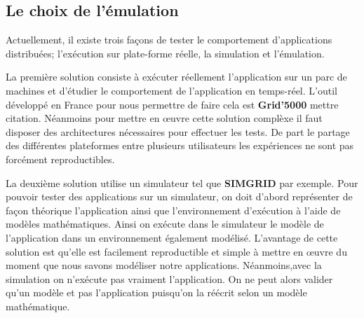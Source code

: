 \subsection{Le choix de l'émulation}

Actuellement, il existe trois façons de tester le comportement d'applications distribuées; l'exécution sur plate-forme réelle, la simulation et l'émulation. 

La première solution consiste à exécuter réellement l'application sur un parc de machines et d'étudier le comportement de l'application en temps-réel. L'outil développé en France pour nous permettre de faire cela est \textbf{Grid'5000} {\color{red}mettre citation}. Néanmoins pour mettre en \oe uvre cette solution complèxe il faut disposer des architectures nécessaires pour effectuer les tests. De part le partage des différentes plateformes entre plusieurs utilisateurs les expériences ne sont pas forcément reproductibles. 

La deuxième solution utilise un simulateur tel que \textbf{SIMGRID}\cite{MARTIN:SimGrid} par exemple. Pour pouvoir tester des applications sur un simulateur, on doit d'abord représenter de façon théorique l'application ainsi que l'environnement d'exécution à l'aide de modèles mathématiques. Ainsi on exécute dans le simulateur le modèle de l'application dans un environnement également modélisé. L'avantage de cette solution est qu'elle est facilement reproductible et simple à mettre en \oe uvre du moment que nous savons modéliser notre applications. Néanmoins,avec la simulation on n'exécute pas vraiment l'application. On ne peut alors valider qu'un modèle et pas l'application puisqu'on la réécrit selon un modèle mathématique. 

